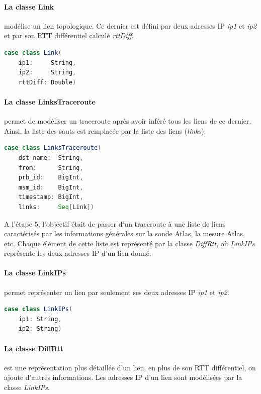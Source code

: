 \paragraph{La classe Link} modélise un lien topologique. Ce dernier est défini par deux adresses IP  \textit{ip1} et \textit{ip2} et par son RTT différentiel calculé \textit{rttDiff}.
\begin{lstlisting}[language=scala, caption={La classe Link en Scala }]
case class Link(
	ip1:     String,
	ip2:     String,
	rttDiff: Double)
\end{lstlisting}

\paragraph{La classe LinksTraceroute} permet de modéliser un traceroute après avoir inféré tous les liens de ce dernier. Ainsi, la liste des sauts est remplacée par la liste des liens (\textit{links}). 

\begin{lstlisting}[language=scala, caption={La classe LinksTraceroute en Scala }]
case class LinksTraceroute(
	dst_name:  String,
	from:      String,
	prb_id:    BigInt,
	msm_id:    BigInt,
	timestamp: BigInt,
	links:     Seq[Link])
\end{lstlisting}


A l'étape 5, l'objectif était de passer d'un traceroute à une liste de liens caractérisés par les informations générales sur la sonde Atlas, la mesure Atlas, etc. Chaque élément de cette liste est représenté par la classe \textit{DiffRtt}, où \textit{LinkIPs} représente les deux adresses IP d'un lien donné.
\paragraph{La classe LinkIPs} permet représenter un lien par seulement ses deux adresses IP \textit{ip1} et \textit{ip2}.
\begin{lstlisting}[language=scala, caption={La classe LinkIPs en Scala }]
case class LinkIPs(
	ip1: String,
	ip2: String)
\end{lstlisting}

\paragraph{La classe DiffRtt} est une représentation plus détaillée d'un lien, en plus de son RTT différentiel, on ajoute d'autres informations.  Les adresses IP d'un lien sont modélisées par la classe \textit{LinkIPs}.

